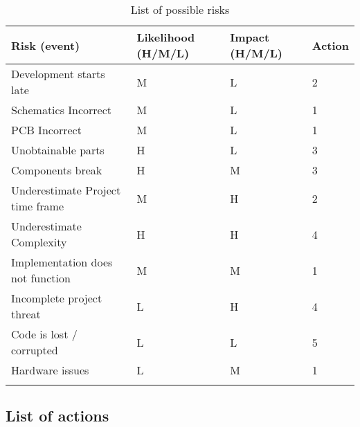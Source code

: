 \documentclass[a4paper, 11pt, twoside]{Thesis}  %
\begin{document}
\begin{table}[!h]
\centering
\begin{tabulary}{\textwidth}{LLLL}
\hline\hline
 Risk (event)                      &  Likelihood (H/M/L)  &  Impact (H/M/L)  &  Action \\
\hline
\hline
 Development starts late           &  M                   &  L               &       2 \\
 Schematics Incorrect              &  M                   &  L               &       1 \\
 PCB Incorrect                     &  M                   &  L               &       1 \\
 Unobtainable parts                &  H                   &  L               &       3 \\
 Components break                  &  H                   &  M               &       3 \\
 Underestimate Project time frame  &  M                   &  H               &       2 \\
 Underestimate Complexity          &  H                   &  H               &       4 \\
 Implementation does not function  &  M                   &  M               &       1 \\
 Incomplete project threat         &  L                   &  H               &       4 \\
 Code is lost / corrupted          &  L                   &  L               &       5 \\
 Hardware issues                   &  L                   &  M               &       1 \\
\hline
\\
\end{tabulary}
\caption{			List of possible risks}
\label{1}
\end{table}



\subsection{List of actions}
\end{document}
